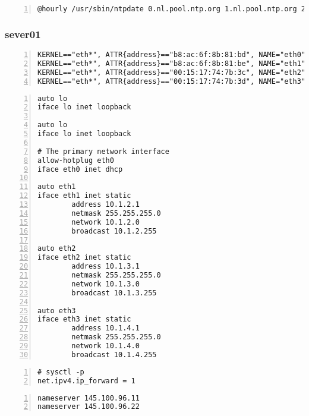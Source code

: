 \documentclass[Configuration]{subfiles}
\begin{document}
\begin{lstlisting}[frame=single,caption=cronjob -l ,backgroundcolor=\color{gray},breaklines=true,numbers=left,]
@hourly /usr/sbin/ntpdate 0.nl.pool.ntp.org 1.nl.pool.ntp.org 2.nl.pool.ntp.org 3.nl.pool.ntp.org
\end{lstlisting}

\subsubsection{sever01}

\begin{lstlisting}[frame=single,caption=/etc/udev/rules.d/70-persistent-net.rules,backgroundcolor=\color{gray},breaklines=true,numbers=left,]
KERNEL=="eth*", ATTR{address}=="b8:ac:6f:8b:81:bd", NAME="eth0"
KERNEL=="eth*", ATTR{address}=="b8:ac:6f:8b:81:be", NAME="eth1"
KERNEL=="eth*", ATTR{address}=="00:15:17:74:7b:3c", NAME="eth2"
KERNEL=="eth*", ATTR{address}=="00:15:17:74:7b:3d", NAME="eth3"
\end{lstlisting}

\begin{lstlisting}[frame=single,caption=/etc/network/interfaces,backgroundcolor=\color{gray},breaklines=true,numbers=left,]
auto lo
iface lo inet loopback

auto lo
iface lo inet loopback

# The primary network interface
allow-hotplug eth0
iface eth0 inet dhcp

auto eth1
iface eth1 inet static
        address 10.1.2.1
        netmask 255.255.255.0
        network 10.1.2.0
        broadcast 10.1.2.255

auto eth2
iface eth2 inet static
        address 10.1.3.1
        netmask 255.255.255.0
        network 10.1.3.0
        broadcast 10.1.3.255

auto eth3
iface eth3 inet static
        address 10.1.4.1
        netmask 255.255.255.0
        network 10.1.4.0
        broadcast 10.1.4.255
\end{lstlisting}

\begin{lstlisting}[frame=single,caption=/etc/resolv.conf,backgroundcolor=\color{gray},breaklines=true,numbers=left,]
# sysctl -p
net.ipv4.ip_forward = 1
\end{lstlisting}

\begin{lstlisting}[frame=single,caption=/etc/resolv.conf,backgroundcolor=\color{gray},breaklines=true,numbers=left,]
nameserver 145.100.96.11
nameserver 145.100.96.22
\end{lstlisting}
\end{document}
